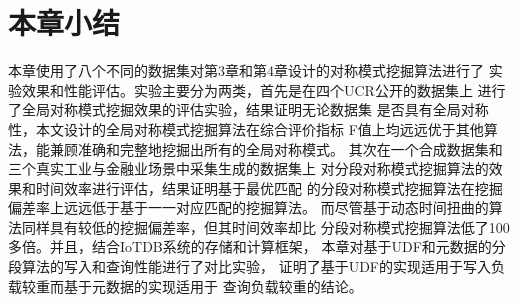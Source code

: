 \section{本章小结}
本章使用了八个不同的数据集对第3章和第4章设计的对称模式挖掘算法进行了
实验效果和性能评估。实验主要分为两类，首先是在四个UCR公开的数据集上
进行了全局对称模式挖掘效果的评估实验，结果证明无论数据集
是否具有全局对称性，本文设计的全局对称模式挖掘算法在综合评价指标
F值上均远远优于其他算法，能兼顾准确和完整地挖掘出所有的全局对称模式。
其次在一个合成数据集和三个真实工业与金融业场景中采集生成的数据集上
对分段对称模式挖掘算法的效果和时间效率进行评估，结果证明基于最优匹配
的分段对称模式挖掘算法在挖掘偏差率上远远低于基于一一对应匹配的挖掘算法。
而尽管基于动态时间扭曲的算法同样具有较低的挖掘偏差率，但其时间效率却比
分段对称模式挖掘算法低了100多倍。并且，结合IoTDB系统的存储和计算框架，
本章对基于UDF和元数据的分段算法的写入和查询性能进行了对比实验，
证明了基于UDF的实现适用于写入负载较重而基于元数据的实现适用于
查询负载较重的结论。
